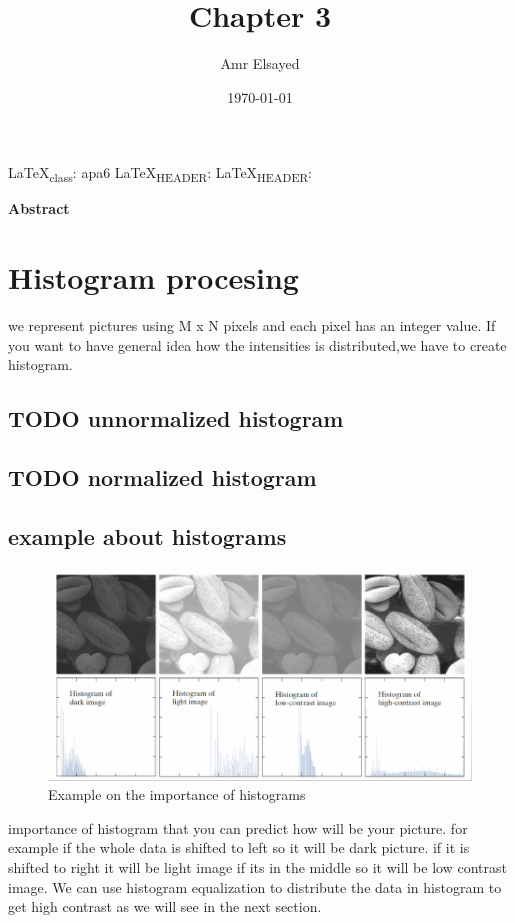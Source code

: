 \documentclass[a4paper]{article}
\author{Amr Elsayed}
\date{\today}
\title{Chapter 3}
\begin{document}
\maketitle
\tableofcontents

\LaTeX{}\textsubscript{class}: apa6
\LaTeX{}\textsubscript{HEADER}: 
\LaTeX{}\textsubscript{HEADER}: 
\begin{ABSTRACT}
\textbf{Abstract}
\end{ABSTRACT}
\tableofcontents
\section{Histogram procesing}
\label{sec:org4fd51ef}
we represent pictures using M x N pixels and each pixel has an integer value.
If you want to have general idea how the intensities is distributed,we have to create histogram.
\subsection{{\bfseries\sffamily TODO} unnormalized histogram}
\label{sec:org59b76ff}
\subsection{{\bfseries\sffamily TODO} normalized histogram}
\label{sec:orgde7271a}
\subsection{example about histograms}
\label{sec:org3085f70}
\begin{figure}[htbp]
\centering
\includegraphics[width=.9\linewidth]{./img/histogram_example.png}
\caption{\label{Histogram_example}Example on the importance of histograms}
\end{figure}

importance of histogram that you can predict how will be your picture.
for example if the whole data is shifted to left so it will be dark picture.
if it is shifted to right it will be light image
if its in the middle so it will be low contrast image.
We can use histogram equalization to distribute the data in histogram to get high contrast as we will see in the next section.
\end{document}
